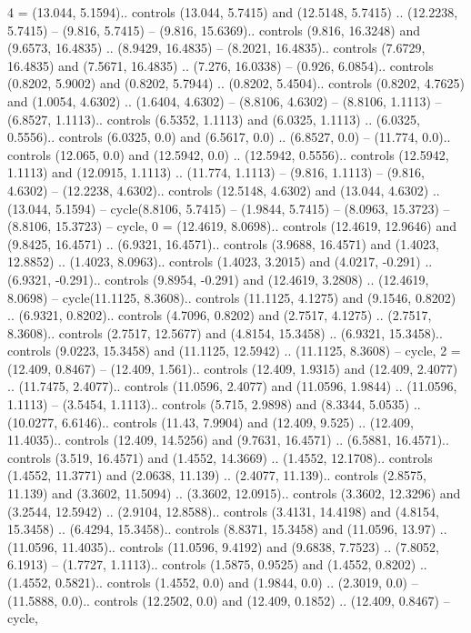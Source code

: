 {4} = {(13.044, 5.1594).. controls (13.044, 5.7415) and (12.5148, 5.7415) .. (12.2238, 5.7415) -- (9.816, 5.7415) -- (9.816, 15.6369).. controls (9.816, 16.3248) and (9.6573, 16.4835) .. (8.9429, 16.4835) -- (8.2021, 16.4835).. controls (7.6729, 16.4835) and (7.5671, 16.4835) .. (7.276, 16.0338) -- (0.926, 6.0854).. controls (0.8202, 5.9002) and (0.8202, 5.7944) .. (0.8202, 5.4504).. controls (0.8202, 4.7625) and (1.0054, 4.6302) .. (1.6404, 4.6302) -- (8.8106, 4.6302) -- (8.8106, 1.1113) -- (6.8527, 1.1113).. controls (6.5352, 1.1113) and (6.0325, 1.1113) .. (6.0325, 0.5556).. controls (6.0325, 0.0) and (6.5617, 0.0) .. (6.8527, 0.0) -- (11.774, 0.0).. controls (12.065, 0.0) and (12.5942, 0.0) .. (12.5942, 0.5556).. controls (12.5942, 1.1113) and (12.0915, 1.1113) .. (11.774, 1.1113) -- (9.816, 1.1113) -- (9.816, 4.6302) -- (12.2238, 4.6302).. controls (12.5148, 4.6302) and (13.044, 4.6302) .. (13.044, 5.1594) -- cycle(8.8106, 5.7415) -- (1.9844, 5.7415) -- (8.0963, 15.3723) -- (8.8106, 15.3723) -- cycle},
{0} = {(12.4619, 8.0698).. controls (12.4619, 12.9646) and (9.8425, 16.4571) .. (6.9321, 16.4571).. controls (3.9688, 16.4571) and (1.4023, 12.8852) .. (1.4023, 8.0963).. controls (1.4023, 3.2015) and (4.0217, -0.291) .. (6.9321, -0.291).. controls (9.8954, -0.291) and (12.4619, 3.2808) .. (12.4619, 8.0698) -- cycle(11.1125, 8.3608).. controls (11.1125, 4.1275) and (9.1546, 0.8202) .. (6.9321, 0.8202).. controls (4.7096, 0.8202) and (2.7517, 4.1275) .. (2.7517, 8.3608).. controls (2.7517, 12.5677) and (4.8154, 15.3458) .. (6.9321, 15.3458).. controls (9.0223, 15.3458) and (11.1125, 12.5942) .. (11.1125, 8.3608) -- cycle},
{2} = {(12.409, 0.8467) -- (12.409, 1.561).. controls (12.409, 1.9315) and (12.409, 2.4077) .. (11.7475, 2.4077).. controls (11.0596, 2.4077) and (11.0596, 1.9844) .. (11.0596, 1.1113) -- (3.5454, 1.1113).. controls (5.715, 2.9898) and (8.3344, 5.0535) .. (10.0277, 6.6146).. controls (11.43, 7.9904) and (12.409, 9.525) .. (12.409, 11.4035).. controls (12.409, 14.5256) and (9.7631, 16.4571) .. (6.5881, 16.4571).. controls (3.519, 16.4571) and (1.4552, 14.3669) .. (1.4552, 12.1708).. controls (1.4552, 11.3771) and (2.0638, 11.139) .. (2.4077, 11.139).. controls (2.8575, 11.139) and (3.3602, 11.5094) .. (3.3602, 12.0915).. controls (3.3602, 12.3296) and (3.2544, 12.5942) .. (2.9104, 12.8588).. controls (3.4131, 14.4198) and (4.8154, 15.3458) .. (6.4294, 15.3458).. controls (8.8371, 15.3458) and (11.0596, 13.97) .. (11.0596, 11.4035).. controls (11.0596, 9.4192) and (9.6838, 7.7523) .. (7.8052, 6.1913) -- (1.7727, 1.1113).. controls (1.5875, 0.9525) and (1.4552, 0.8202) .. (1.4552, 0.5821).. controls (1.4552, 0.0) and (1.9844, 0.0) .. (2.3019, 0.0) -- (11.5888, 0.0).. controls (12.2502, 0.0) and (12.409, 0.1852) .. (12.409, 0.8467) -- cycle},
